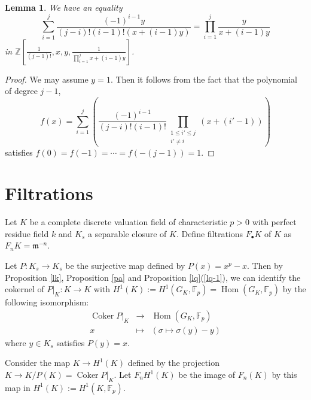 \documentclass[sn-mathphys-num]{sn-jnl}
\numberwithin{equation}{section}
\theoremstyle{plain}
\newtheorem{lemm}[theo]{Lemma}
\theoremstyle{definition}
\begin{document}
\begin{lemm}\label{laf}
  We have an equality
  \begin{equation}
  \sum_{i=1}^j\frac{(-1)^{i-1}y}{(j-i)!(i-1)!(x+(i-1)y)}=\prod_{i=1}^{j}\frac{y}{x+(i-1)y}
  \end{equation}
  in $\displaystyle{\mathbb{Z}\left[\frac{1}{(j-1)!},x,y,\frac{1}{\prod_{i=1}^{j}x+(i-1)y}\right]}$.
  \end{lemm}

\begin{proof}
  We may assume $y=1$. Then it follows from the fact that the polynomial of degree $j-1$,
  \begin{equation}
  f(x)=\sum_{i=1}^j\left(\frac{(-1)^{i-1}}{(j-i)!(i-1)!}\prod_{\substack{1\leq i'\leq j\\i'\neq i }}(x+(i'-1))\right)
  \end{equation}
   satisfies $f(0)=f(-1)=\cdots=f(-(j-1))=1$. 
\end{proof}














\section{Filtrations}\label{sb}

Let $K$ be a complete discrete valuation field of characteristic $p>0$ with perfect residue field $k$ and $K_s$ a separable closure of $K$. Define filtrations $F_\bullet K$ of $K$ as $F_nK={\mathfrak{m}}^{-n}$. 

Let $P:K_s\to K_s$ be the surjective map defined by $P(x)=x^p-x$. Then by Proposition \ref{lk}, Proposition \ref{pa} and Proposition \ref{lq}(\ref{lq-1}), we can identify the cokernel of $P|_K:K\to K$ with $H^1(K):=H^1(G_K,\mathbb{F}_p)=\operatorname{Hom}(G_K,\mathbb{F}_p)$ by the following isomorphism:
\begin{equation}
\begin{array}{ccc}
  \operatorname{Coker}P|_K&\to&\operatorname{Hom}(G_K,\mathbb{F}_p)\\
  x&\mapsto&(\sigma\mapsto \sigma(y)-y) 
\end{array}
\end{equation}
where $y\in K_s$ satisfies $P(y)=x$. 

Consider the map $K\to H^1(K)$ defined by the projection $K\to K/P(K)=\operatorname{Coker}P|_K$. Let $F_nH^1(K)$ be the image of $F_n(K)$ by this map in $H^1(K):=H^1(K,\mathbb{F}_p)$.
\end{document}
